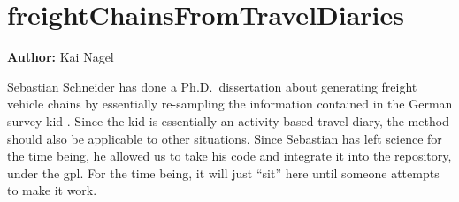 \chapter{freightChainsFromTravelDiaries}
\label{sec:freightChainsFromTravelDiaries}

\hfill \textbf{Author:} Kai Nagel



Sebastian Schneider has done a Ph.D.\ dissertation about generating freight vehicle chains by essentially re-sampling the information contained in the German survey \gls{kid} \citep{SteinmeyerWagner2005KiD}.  
Since the \gls{kid} is essentially an activity-based travel diary, the method should also be applicable to other situations.
Since Sebastian has left science for the time being, he allowed us to take his code and integrate it into the repository, under the \gls{gpl}. For the time being, it will just ``sit'' here until someone attempts to make it work.

